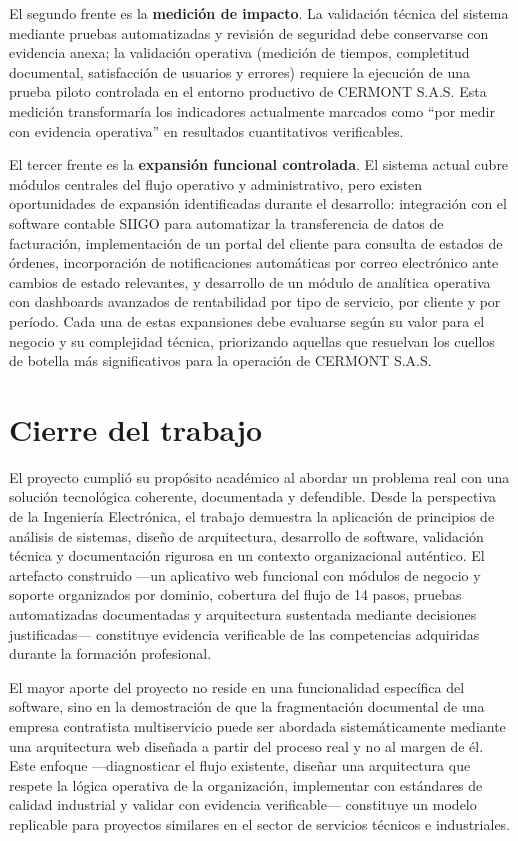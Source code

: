 El segundo frente es la \textbf{medición de impacto}. La validación técnica del sistema mediante pruebas automatizadas y revisión de seguridad debe conservarse con evidencia anexa; la validación operativa (medición de tiempos, completitud documental, satisfacción de usuarios y errores) requiere la ejecución de una prueba piloto controlada en el entorno productivo de CERMONT S.A.S. Esta medición transformaría los indicadores actualmente marcados como ``por medir con evidencia operativa'' en resultados cuantitativos verificables.

El tercer frente es la \textbf{expansión funcional controlada}. El sistema actual cubre módulos centrales del flujo operativo y administrativo, pero existen oportunidades de expansión identificadas durante el desarrollo: integración con el software contable SIIGO para automatizar la transferencia de datos de facturación, implementación de un portal del cliente para consulta de estados de órdenes, incorporación de notificaciones automáticas por correo electrónico ante cambios de estado relevantes, y desarrollo de un módulo de analítica operativa con dashboards avanzados de rentabilidad por tipo de servicio, por cliente y por período. Cada una de estas expansiones debe evaluarse según su valor para el negocio y su complejidad técnica, priorizando aquellas que resuelvan los cuellos de botella más significativos para la operación de CERMONT S.A.S.

\section{Cierre del trabajo}

El proyecto cumplió su propósito académico al abordar un problema real con una solución tecnológica coherente, documentada y defendible. Desde la perspectiva de la Ingeniería Electrónica, el trabajo demuestra la aplicación de principios de análisis de sistemas, diseño de arquitectura, desarrollo de software, validación técnica y documentación rigurosa en un contexto organizacional auténtico. El artefacto construido —un aplicativo web funcional con módulos de negocio y soporte organizados por dominio, cobertura del flujo de 14 pasos, pruebas automatizadas documentadas y arquitectura sustentada mediante decisiones justificadas— constituye evidencia verificable de las competencias adquiridas durante la formación profesional.

El mayor aporte del proyecto no reside en una funcionalidad específica del software, sino en la demostración de que la fragmentación documental de una empresa contratista multiservicio puede ser abordada sistemáticamente mediante una arquitectura web diseñada a partir del proceso real y no al margen de él. Este enfoque —diagnosticar el flujo existente, diseñar una arquitectura que respete la lógica operativa de la organización, implementar con estándares de calidad industrial y validar con evidencia verificable— constituye un modelo replicable para proyectos similares en el sector de servicios técnicos e industriales.

